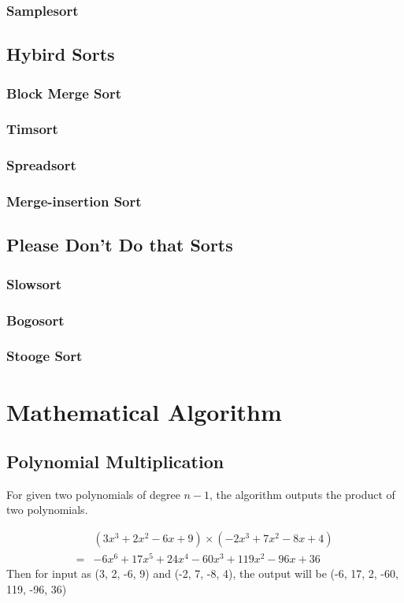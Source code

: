 			\subsection{Samplesort}

		\section{Hybird Sorts}
			\subsection{Block Merge Sort}

			\subsection{Timsort}

			\subsection{Spreadsort}

			\subsection{Merge-insertion Sort}

		\section{Please Don't Do that Sorts}
			\subsection{Slowsort}

			\subsection{Bogosort}

			\subsection{Stooge Sort}

	\chapter{Mathematical Algorithm}
		\section{Polynomial Multiplication}
			For given two polynomials of degree $n - 1$, the algorithm outputs the product of two polynomials.
			\begin{example}
				\begin{align}
					&(3x^3 + 2x^2 - 6x + 9) \times (-2x^3 + 7x^2 - 8x + 4)\\
					=& -6x^6 + 17x^5 + 24x^4 -60x^3 +119x^2 -96x +36
				\end{align}
				Then for input as (3, 2, -6, 9) and (-2, 7, -8, 4), the output will be (-6, 17, 2, -60, 119, -96, 36)
			\end{example}

